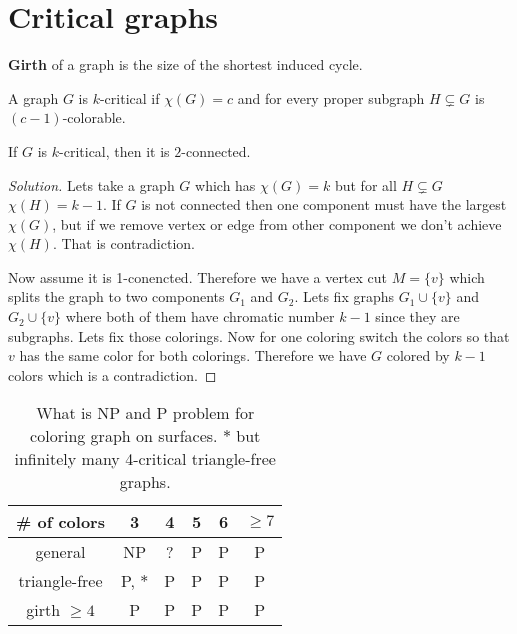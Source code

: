 \chapter{Critical graphs}

\begin{defn}
	\textbf{Girth} of a graph is the size of the shortest induced cycle.
\end{defn}

\begin{defn}
	A graph $G$ is $k$-critical if $\chi(G) = c$ and for every proper subgraph $H \subsetneq G$ is $(c-1)$-colorable.
\end{defn}


\begin{exerc}
	If $G$ is $k$-critical, then it is $2$-connected.
\end{exerc}

\begin{proof}[Solution]
	Lets take a graph $G$ which has $\chi(G) = k$ but for all $H \subsetneq G$ $\chi(H) = k-1$. If $G$ is not connected then one component must have the largest $\chi(G)$, but if we remove vertex or edge from other component we don't achieve $\chi(H)$. That is contradiction.
	
	Now assume it is 1-conencted. Therefore we have a vertex cut $M = \{v\}$ which splits the graph to two components $G_1$ and $G_2$. Lets fix graphs $G_1 \cup \{v\}$ and $G_2 \cup \{v\}$ where both of them have chromatic number $k - 1$ since they are subgraphs. Lets fix those colorings. Now for one coloring switch the colors so that $v$ has the same color for both colorings. Therefore we have $G$ colored by $k-1$ colors which is a contradiction.
\end{proof}

\begin{table}[!ht]\centering
	\begin{tabular}{c|c|c|c|c|c}
		\# of colors & 3 & 4 & 5 & 6 & $\geq 7$ \\
		\hline
		general & NP & ? & P & P & P \\
		triangle-free & P, $\ast$ & P & P & P & P \\
		girth $\geq 4$ & P & P & P & P & P
	\end{tabular}
	\caption{What is NP and P problem for coloring graph on surfaces. \small{$\ast$ but infinitely many 4-critical triangle-free graphs.}}
\end{table}


